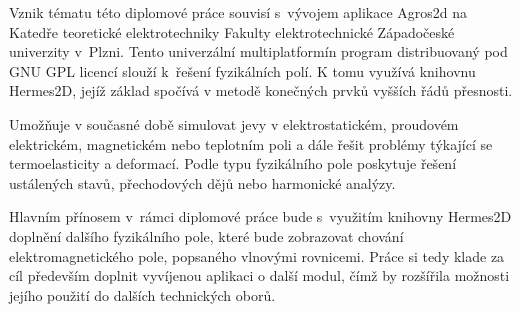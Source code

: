 Vznik tématu této diplomové práce souvisí s~vývojem aplikace Agros2d na Katedře teoretické elektrotechniky Fakulty elektrotechnické Západočeské univerzity v~Plzni. Tento univerzální multiplatformín program distribuovaný pod GNU GPL licencí slouží k~řešení fyzikálních polí. K tomu využívá knihovnu Hermes2D, jejíž základ spočívá v metodě konečných prvků vyšších řádů přesnosti.  

Umožňuje v současné době simulovat jevy v elektrostatickém, proudovém elektrickém, magnetickém nebo teplotním poli a dále řešit problémy týkající se termoelasticity a deformací. Podle typu fyzikálního pole poskytuje řešení ustálených stavů, přechodových dějů nebo harmonické analýzy.  

Hlavním přínosem v~rámci diplomové práce bude s~využitím knihovny Hermes2D doplnění dalšího fyzikálního pole, které bude zobrazovat chování elektromagnetického pole, popsaného vlnovými rovnicemi. Práce si tedy klade za cíl především doplnit vyvíjenou aplikaci o další modul, čímž by rozšířila možnosti jejího použití do dalších technických oborů. 
